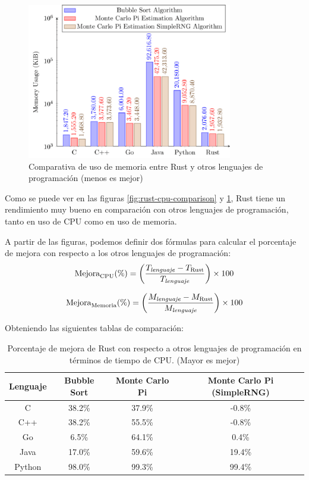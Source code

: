 \begin{figure}[H]
  \centering
  \includegraphics[width=0.8\textwidth]{assets/rust-memory-comparison.png}
  \caption{Comparativa de uso de memoria entre Rust y otros lenguajes de programación (menos es mejor) \parencite{rust-for-safety-and-performance}}
  \label{fig:rust-memory-comparison}
\end{figure}

Como se puede ver en las figuras \ref{fig:rust-cpu-comparison} y \ref{fig:rust-memory-comparison}, Rust tiene un rendimiento muy bueno en comparación con otros lenguajes de programación, tanto en uso de CPU como en uso de memoria.

A partir de las figuras, podemos definir dos fórmulas para calcular el porcentaje de mejora con respecto a los otros lenguajes de programación:
\[
\text{Mejora}_{\text{CPU}} (\%) = \left( \frac{T_{\text{\textit{lenguaje}}} - T_{\text{Rust}}}{T_{\text{\textit{lenguaje}}}} \right) \times 100
\]

\[
\text{Mejora}_{\text{Memoria}} (\%) = \left( \frac{M_{\text{\textit{lenguaje}}} - M_{\text{Rust}}}{M_{\text{\textit{lenguaje}}}} \right) \times 100
\]

Obteniendo las siguientes tablas de comparación:

\begin{table}[h!]
\centering
\begin{tabular}{|c|c|c|c|}
\hline
\textbf{Lenguaje} & \textbf{Bubble Sort} & \textbf{Monte Carlo Pi} & \textbf{Monte Carlo Pi (SimpleRNG)} \\
\hline
C      & 38.2\%  & 37.9\%  & -0.8\% \\
C++    & 38.2\%  & 55.5\%  & -0.8\% \\
Go     & 6.5\%   & 64.1\%  & 0.4\%           \\
Java   & 17.0\%  & 59.6\%  & 19.4\%          \\
Python & 98.0\%  & 99.3\%  & 99.4\%          \\
\hline
\end{tabular}
\caption{Porcentaje de mejora de Rust con respecto a otros lenguajes de programación en términos de tiempo de CPU. (Mayor es mejor)}
\end{table}

